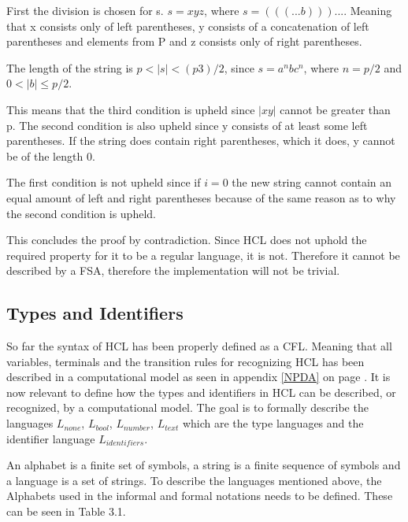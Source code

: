 First the division is chosen for s.
$s = xyz$, where $s = (((...b)))...$.
Meaning that x consists only of left parentheses, y consists of a concatenation of left parentheses and elements from P and z consists only of right parentheses.

The length of the string is $p < |s| < (p3)/2$, since $s = a^nbc^n$, where $n = p/2$ and $0 < |b| \leq p/2$.

This means that the third condition is upheld since $|xy|$ cannot be greater than p.
The second condition is also upheld since y consists of at least some left parentheses. 
If the string does contain right parentheses, which it does, y cannot be of the length 0.

The first condition is not upheld since if $i = 0$ the new string cannot contain an equal amount of left and right parentheses because of the same reason as to why the second condition is upheld.

This concludes the proof by contradiction.
Since HCL does not uphold the required property for it to be a regular language, it is not.
Therefore it cannot be described by a FSA, therefore the implementation will not be trivial.

\subsection{Types and Identifiers}
So far the syntax of HCL has been properly defined as a CFL. 
Meaning that all variables, terminals and the transition rules for recognizing HCL has been described in a computational model as seen in appendix \ref{NPDA} on page \pageref{NPDA}.
It is now relevant to define how the types and identifiers in HCL can be described, or recognized, by a computational model.
The goal is to formally describe the languages $L_{none}$, $L_{bool}$, $L_{number}$, $L_{text}$ which are the type languages and the identifier language $L_{identifiers}$.

An alphabet is a finite set of symbols, a string is a finite sequence of symbols and a language is a set of strings.
To describe the languages mentioned above, the Alphabets used in the informal and formal notations needs to be defined. 
These can be seen in Table 3.1.

